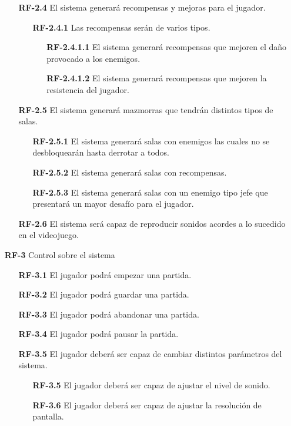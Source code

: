 \begin{enumerate}
\begin{enumerate}
        \item[\textbf{RF-2.4}] El sistema generará recompensas y mejoras para el jugador. 
        \begin{enumerate}
            \item[\textbf{RF-2.4.1}] Las recompensas serán de varios tipos.
            \begin{enumerate}
                \item[\textbf{RF-2.4.1.1}] El sistema generará recompensas que mejoren el daño provocado a los enemigos.
                \item[\textbf{RF-2.4.1.2}] El sistema generará recompensas que mejoren la resistencia del jugador.
            \end{enumerate}
        \end{enumerate}
        \item[\textbf{RF-2.5}]El sistema generará mazmorras que tendrán distintos tipos de salas.
        \begin{enumerate}
            \item[\textbf{RF-2.5.1}] El sistema generará salas con enemigos las cuales no se desbloquearán hasta derrotar a todos.
            \item[\textbf{RF-2.5.2}] El sistema generará salas con recompensas. 
            \item[\textbf{RF-2.5.3}] El sistema generará salas con un enemigo tipo jefe que presentará un mayor desafío para el jugador. 
        \end{enumerate}
        \item[\textbf{RF-2.6}] El sistema será capaz de reproducir sonidos acordes a lo sucedido en el videojuego.
    \end{enumerate}
    \item[\textbf{RF-3}] Control sobre el sistema
    \begin{enumerate}
        \item[\textbf{RF-3.1}] El jugador podrá empezar una partida.
        \item[\textbf{RF-3.2}] El jugador podrá guardar una partida.
        \item[\textbf{RF-3.3}] El jugador podrá abandonar una partida.
        \item[\textbf{RF-3.4}] El jugador podrá pausar la partida.
        \item[\textbf{RF-3.5}] El jugador deberá ser capaz de cambiar distintos parámetros del sistema.
        \begin{enumerate}
            \item[\textbf{RF-3.5}]  El jugador deberá ser capaz de ajustar el nivel de sonido.
            \item[\textbf{RF-3.6}]  El jugador deberá ser capaz de ajustar la resolución de pantalla.
        \end{enumerate} 
    \end{enumerate}
\end{enumerate}


